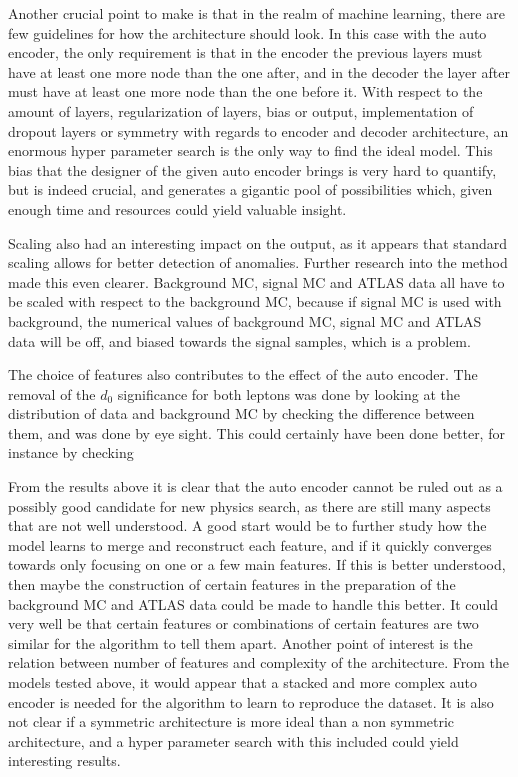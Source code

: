 \documentclass[ reprint, amsmath,amssymb, aps, nofootinbib]{revtex4-2}
\begin{document}
Another crucial point to make is that in the realm of machine learning, there are few guidelines for how the architecture should look. In this case with the auto encoder, the only requirement is that in the encoder the previous layers must have at least one more node than the one after, and in the decoder the layer after must have at least one more node than the one before it. With respect to the amount of layers, regularization of layers, bias or output, implementation of dropout layers or symmetry with regards to encoder and decoder architecture, an enormous hyper parameter search is the only way to find the ideal model. This bias that the designer of the given auto encoder brings is very hard to quantify, but is indeed crucial, and generates a gigantic pool of possibilities which, given enough time and resources could yield valuable insight. \par \par
Scaling also had an interesting impact on the output, as it appears that standard scaling allows for better detection of anomalies. Further research into the method made this even clearer. Background MC, signal MC and ATLAS data all have to be scaled with respect to the background MC, because if signal MC is used with background, the numerical values of background MC, signal MC and ATLAS data will be off, and biased towards the signal samples, which is a problem. \par \par


The choice of features also contributes to the effect of the auto encoder. The removal of the $d_0$ significance for both leptons was done by looking at the distribution of data and background MC by checking the difference between them, and was done by eye sight. This could certainly have been done better, for instance by checking  \par \par



From the results above it is clear that the auto encoder cannot be ruled out as a possibly good candidate for new physics search, as there are still many aspects that are not well understood. A good start would be to further study how the model learns to merge and reconstruct each feature, and if it quickly converges towards only focusing on one or a few main features. If this is better understood, then maybe the construction of certain features in the preparation of the background MC and ATLAS data could be made to handle this better. It could very well be that certain features or combinations of certain features are two similar for the algorithm to tell them apart. Another point of interest is the relation between number of features and complexity of the architecture. From the models tested above, it would appear that a stacked and more complex auto encoder is needed for the algorithm to learn to reproduce the dataset. It is also not clear if a symmetric architecture is more ideal than a non symmetric architecture, and a hyper parameter search with this included could yield interesting results. \par \par
\end{document}
